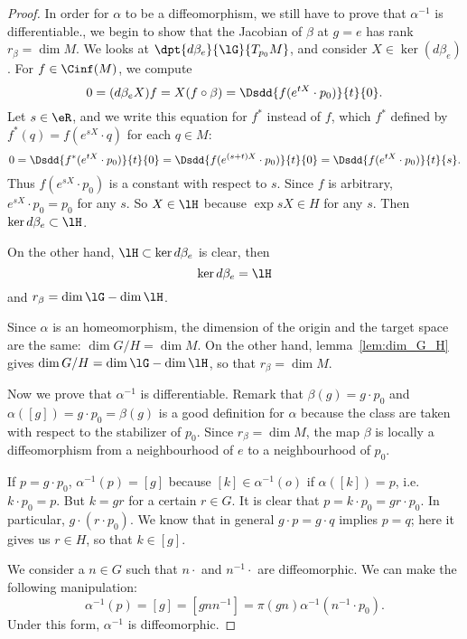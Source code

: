 \begin{proof}
In order for $\alpha$ to be a diffeomorphism, we still have to prove that $\alpha^{-1}$ is differentiable., we begin to show that the Jacobian of $\beta$ at $g=e$ has rank $r_{\beta}=\dim M$. We looks at $\dpt{d\beta_e}{\lG}{T_{p_0}M}$, and consider $X\in\ker (d\beta_e)$. For $f\in\Cinf(M)$, we compute
\begin{equation}
  0=(d\beta_e X)f=X(f\circ\beta)=\Dsdd{ f(e^{tX}\cdot p_0) }{t}{0}.
\end{equation}
Let $s\in\eR$, and we write this equation for $f^*$ instead of $f$, which $f^*$ defined by $f^*(q)=f(e^{sX}\cdot q)$ for each $q\in M$:
\begin{equation}
  0=\Dsdd{f^*(e^{tX}\cdot p_0)}{t}{0}
      =\Dsdd{ f(e^{(s+t)X}\cdot p_0) }{t}{0}
      =\Dsdd{ f(e^{tX}\cdot p_0) }{t}{s}.
\end{equation}
Thus $f(e^{sX}\cdot p_0)$ is a constant with respect to $s$. Since $f$ is arbitrary, $e^{sX}\cdot p_0=p_0$ for any $s$. So $X\in\lH$ because $\exp sX\in H$ for any $s$. Then $\ker d\beta_e\subset \lH$.

On the other hand, $\lH\subset\ker d\beta_e$ is clear, then
\[
   \ker d\beta_e=\lH
\]
and $r_{\beta}=\dim\lG-\dim\lH$.

Since $\alpha$ is an homeomorphism, the dimension of the origin and the target space are the same: $\dim G/H=\dim M$. On the other hand, lemma~\ref{lem:dim_G_H} gives $\dim G/H=\dim\lG-\dim\lH$, so that $r_{\beta}=\dim M$.

Now we prove that $\alpha^{-1}$ is differentiable. Remark that $\beta(g)=g\cdot p_0$ and $\alpha([g])=g\cdot p_0=\beta(g)$ is a good definition for $\alpha$ because the class are taken with respect to the stabilizer of $p_0$. Since $r_{\beta}=\dim M$, the map $\beta$ is locally a diffeomorphism from a neighbourhood of $e$ to a neighbourhood of $p_0$.

If $p=g\cdot p_0$, $\alpha^{-1}(p)=[g]$ because $[k]\in\alpha^{-1}(o)$ if $\alpha([k])=p$, i.e. $k\cdot p_0=p$. But $k=gr$ for a certain $r\in G$. It is clear that $p=k\cdot p_0=gr\cdot p_0$. In particular, $g\cdot(r\cdot p_0)$. We know that in general $g\cdot p=g\cdot q$ implies $p=q$; here it gives us $r\in H$, so that $k\in [g]$.

We consider a $n\in G$ such that $n\cdot$ and $n^{-1}\cdot$ are diffeomorphic. We can make the following manipulation:
\begin{equation}
   \alpha^{-1}(p)=[g]
                =[gnn^{-1}]
		=\pi(gn)\alpha^{-1}(n^{-1}\cdot p_0).
\end{equation}
Under this form, $\alpha^{-1}$ is diffeomorphic.



\end{proof}
